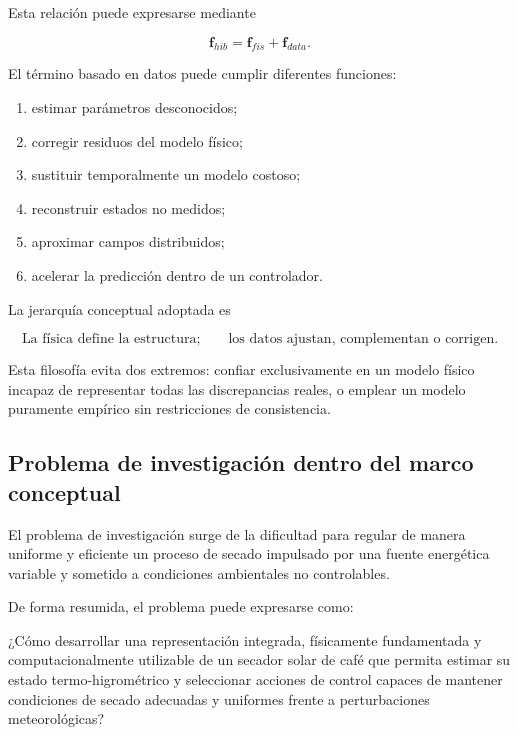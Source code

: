 Esta relación puede expresarse mediante

\begin{equation}
\boxed{
\mathbf{f}_{hib}
=
\mathbf{f}_{fis}
+
\mathbf{f}_{data}.
}
\label{eq:modelo_hibrido_conceptual}
\end{equation}

El término basado en datos puede cumplir diferentes funciones:

\begin{enumerate}
    \item estimar parámetros desconocidos;
    \item corregir residuos del modelo físico;
    \item sustituir temporalmente un modelo costoso;
    \item reconstruir estados no medidos;
    \item aproximar campos distribuidos;
    \item acelerar la predicción dentro de un controlador.
\end{enumerate}

La jerarquía conceptual adoptada es

\begin{equation}
\boxed{
\text{La física define la estructura;}
\qquad
\text{los datos ajustan, complementan o corrigen.}
}
\label{eq:filosofia_hibrida}
\end{equation}

Esta filosofía evita dos extremos: confiar exclusivamente en un modelo físico incapaz de representar todas las discrepancias reales, o emplear un modelo puramente empírico sin restricciones de consistencia.

\subsection{Problema de investigación dentro del marco conceptual}
\label{subsec:problema_marco_conceptual}

El problema de investigación surge de la dificultad para regular de manera uniforme y eficiente un proceso de secado impulsado por una fuente energética variable y sometido a condiciones ambientales no controlables.

De forma resumida, el problema puede expresarse como:

\begin{tcolorbox}[
title=Problema central de investigación,
colback=red!3,
colframe=red!55!black,
boxrule=0.8pt,
arc=2mm
]
¿Cómo desarrollar una representación integrada, físicamente fundamentada y computacionalmente utilizable de un secador solar de café que permita estimar su estado termo-higrométrico y seleccionar acciones de control capaces de mantener condiciones de secado adecuadas y uniformes frente a perturbaciones meteorológicas?
\end{tcolorbox}

